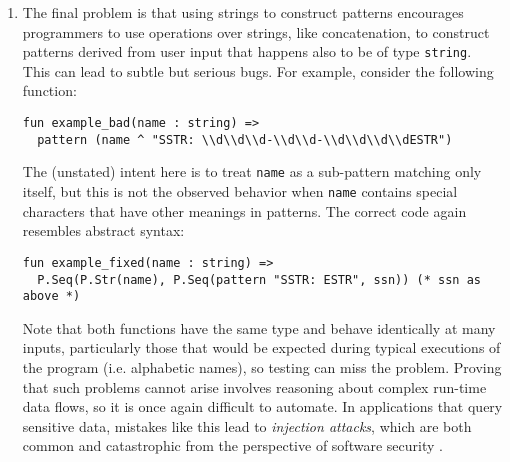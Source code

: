 \begin{enumerate}
\item The final problem is that using strings to construct patterns encourages programmers to use  operations over strings, like concatenation, to construct patterns derived from user input that happens also to be of type \lstinline{string}. This can lead to subtle but serious bugs. For example, consider the following function:
\begin{lstlisting}[numbers=none,escapechar=|]
fun example_bad(name : string) => 
  pattern (name ^ "SSTR: \\d\\d\\d-\\d\\d-\\d\\d\\d\\dESTR")
\end{lstlisting}
The (unstated) intent here is to treat \lstinline{name} as a sub-pattern matching only itself, but this is not the observed behavior when \lstinline{name} contains special characters that have other meanings in patterns. The correct code again resembles abstract syntax: 
\begin{lstlisting}[numbers=none]
fun example_fixed(name : string) => 
  P.Seq(P.Str(name), P.Seq(pattern "SSTR: ESTR", ssn)) (* ssn as above *)
\end{lstlisting}
Note that both functions have the same type and behave identically at many inputs, particularly those that would be expected during typical executions of the program (i.e. alphabetic names), so testing can miss the problem. Proving that such problems cannot arise involves reasoning about complex run-time data flows, so it is once again difficult to automate. 
In applications that query sensitive data, mistakes like this lead to \emph{injection attacks}, which are both common and catastrophic from the perspective of software security \cite{owasp2013}. %

\end{enumerate}


